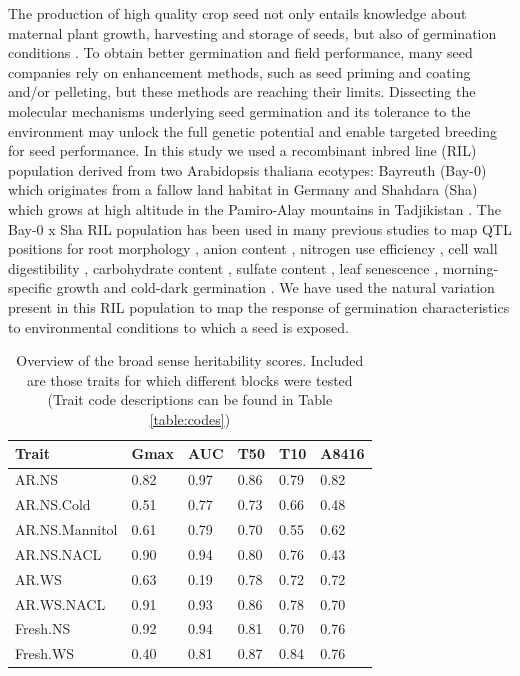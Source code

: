 The production of high quality crop seed not only entails knowledge about maternal plant growth, 
harvesting and storage of seeds, but also of germination conditions \cite{Rivero-Lepinckas:2006}. 
To obtain better germination and field performance, many seed companies rely on enhancement methods, 
such as seed priming and coating and/or pelleting, but these methods are reaching their limits. 
Dissecting the molecular mechanisms underlying seed germination and its tolerance to the environment 
may unlock the full genetic potential and enable targeted breeding for seed performance. In this study 
we used a recombinant inbred line (RIL) population derived from two Arabidopsis thaliana ecotypes: 
Bayreuth (Bay-0) which originates from a fallow land habitat in Germany and Shahdara (Sha) which 
grows at high altitude in the Pamiro-Alay mountains in Tadjikistan \cite{Loudet:2002}. The Bay-0 x 
Sha RIL population has been used in many previous studies to map QTL positions for root morphology 
\cite{Loudet:2005, Reymond:2006}, anion content \cite{Loudet:2003a}, nitrogen use efficiency 
\cite{Loudet:2003b}, cell wall digestibility \cite{Barriere:2012}, carbohydrate content 
\cite{Calenge:2006}, sulfate content \cite{Loudet:2007}, leaf senescence \cite{Diaz:2006}, 
morning-specific growth \cite{Loudet:2008} and cold-dark germination \cite{Meng:2008}. We have used 
the natural variation present in this RIL population to map the response of germination characteristics 
to environmental conditions to which a seed is exposed.

\begin{table}[h]
  \centering
  {\footnotesize
  \begin{tabular}{  l  l  l  l  l  l }
    \hline
    {\bf Trait} & {\bf Gmax} & {\bf AUC} & {\bf T50}& {\bf T10}& {\bf A8416}\\
    \hline
    AR.NS           & 0.82 & 0.97 & 0.86 & 0.79 & 0.82 \\
    AR.NS.Cold      & 0.51 & 0.77 & 0.73 & 0.66 & 0.48 \\
    AR.NS.Mannitol  & 0.61 & 0.79 & 0.70 & 0.55 & 0.62 \\
    AR.NS.NACL      & 0.90 & 0.94 & 0.80 & 0.76 & 0.43 \\
    AR.WS           & 0.63 & 0.19 & 0.78 & 0.72 & 0.72 \\
    AR.WS.NACL      & 0.91 & 0.93 & 0.86 & 0.78 & 0.70 \\
    Fresh.NS        & 0.92 & 0.94 & 0.81 & 0.70 & 0.76 \\
    Fresh.WS        & 0.40 & 0.81 & 0.87 & 0.84 & 0.76 \\
    \hline
  \end{tabular}
  }
  \caption[Heritability Overview]{Overview of the broad sense heritability scores. Included are those traits for which different blocks 
          were tested (Trait code descriptions can be found in Table \ref{table:codes})}
\end{table}

